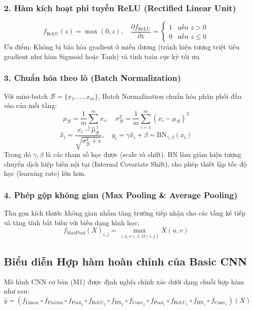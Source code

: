 \documentclass[12pt,a4paper]{article}
\begin{document}
\subsubsection{2. Hàm kích hoạt phi tuyến ReLU (Rectified Linear Unit)}
\begin{equation}
    f_{\text{ReLU}}(z) = \max(0, z), \quad \frac{\partial f_{\text{ReLU}}}{\partial z} = \begin{cases} 1 & \text{nếu } z > 0 \\ 0 & \text{nếu } z \le 0 \end{cases}
\end{equation}
Ưu điểm: Không bị bão hòa gradient ở miền dương (tránh hiện tượng triệt tiêu gradient như hàm Sigmoid hoặc Tanh) và tính toán cực kỳ tối ưu.

\subsubsection{3. Chuẩn hóa theo lô (Batch Normalization)}
Với mini-batch $\mathcal{B} = \{x_1, \dots, x_m\}$, Batch Normalization chuẩn hóa phân phối đầu vào của mỗi tầng:
\begin{equation}
    \mu_{\mathcal{B}} = \frac{1}{m}\sum_{i=1}^m x_i, \quad \sigma_{\mathcal{B}}^2 = \frac{1}{m}\sum_{i=1}^m (x_i - \mu_{\mathcal{B}})^2
\end{equation}
\begin{equation}
    \hat{x}_i = \frac{x_i - \mu_{\mathcal{B}}}{\sqrt{\sigma_{\mathcal{B}}^2 + \epsilon}}, \quad y_i = \gamma \hat{x}_i + \beta = \text{BN}_{\gamma, \beta}(x_i)
\end{equation}
Trong đó $\gamma, \beta$ là các tham số học được (scale và shift). BN làm giảm hiện tượng chuyển dịch hiệp biến nội tại (Internal Covariate Shift), cho phép thiết lập tốc độ học (learning rate) lớn hơn.

\subsubsection{4. Phép gộp không gian (Max Pooling \& Average Pooling)}
Thu gọn kích thước không gian nhằm tăng trường tiếp nhận cho các tầng kế tiếp và tăng tính bất biến với biến dạng hình học:
\begin{equation}
    f_{\text{MaxPool}}(X)_{i, j} = \max_{(u, v) \in \Omega(i, j)} X(u, v)
\end{equation}

\subsection{Biểu diễn Hợp hàm hoàn chỉnh của Basic CNN}
Mô hình CNN cơ bản (M1) được định nghĩa chính xác dưới dạng chuỗi hợp hàm như sau:
\begin{equation}
    \hat{y} = \left( f_{\text{Linear}} \circ f_{\text{Flatten}} \circ f_{\text{Pool}_2} \circ f_{\text{ReLU}_2} \circ f_{\text{BN}_2} \circ f_{\text{Conv}_2} \circ f_{\text{Pool}_1} \circ f_{\text{ReLU}_1} \circ f_{\text{BN}_1} \circ f_{\text{Conv}_1} \right)(X)
    \label{eq:basic_cnn_full_comp}
\end{equation}
\end{document}
